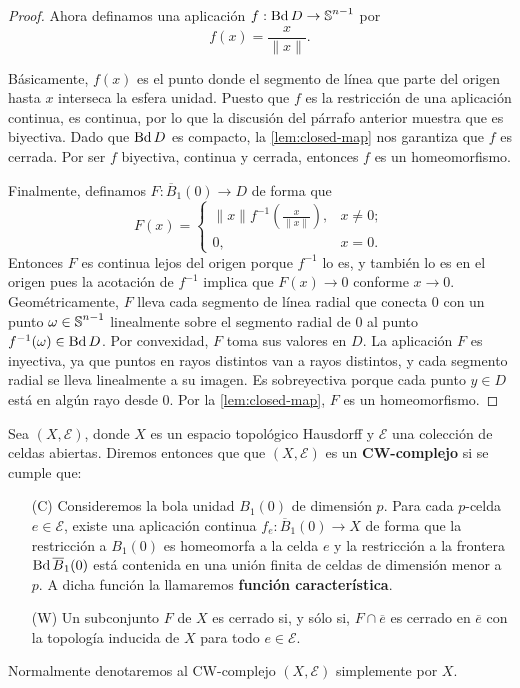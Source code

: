 \begin{proof}
	Ahora definamos una aplicación $f : \operatorname{Bd} D \to \operatorname{\mathbb{S}}^{n-1}$ por
	\[
	f(x) = \frac{x}{\|x\|}.
	\]
	
	Básicamente, $f(x)$ es el punto donde el segmento de línea que parte del
	origen hasta $x$ interseca la esfera unidad. Puesto que $f$ es la restricción de
	una aplicación continua, es continua, por lo que la discusión del párrafo anterior
	muestra que es biyectiva. Dado que $\operatorname{Bd} D$ es compacto, la \autoref{lem:closed-map} nos garantiza que $f$ es cerrada. Por ser $f$ biyectiva, continua y cerrada, entonces $f$ es un homeomorfismo.
	
	Finalmente, definamos $F : \overline{B}_{1}(0) \to D$ de forma que
	\[
	F(x) =
	\begin{cases}
		\|x\| f^{-1}\left( \frac{x}{\|x\|}\right), & x \neq 0; \\
		0,                                     & x = 0.
	\end{cases}
	\]
	Entonces $F$ es continua lejos del origen porque $f^{-1}$ lo es, y también lo es
	en el origen pues la acotación de $f^{-1}$ implica que $F(x) \to 0$ conforme $x
	\to 0$. Geométricamente, $F$ lleva cada segmento de línea radial que conecta $0$
	con un punto $\omega \in \operatorname{\mathbb{S}}^{n-1}$ linealmente sobre el segmento radial de
	$0$ al punto $f^{-1}(\omega) \in \operatorname{Bd} D$. Por convexidad, $F$ toma sus valores en
	$D$. La aplicación $F$ es inyectiva, ya que puntos en rayos distintos van a rayos
	distintos, y cada segmento radial se lleva linealmente a su imagen. Es sobreyectiva
	porque cada punto $y \in D$ está en algún rayo desde $0$. Por la
	\autoref{lem:closed-map}, $F$ es un homeomorfismo.
\end{proof}

\begin{definicion}
	Sea $(X,\mathcal{E})$, donde $X$ es un espacio topológico Hausdorff y
	$\mathcal{E}$ una colección de celdas abiertas. Diremos entonces que que $(X,\mathcal{E}
	)$ es un \textbf{CW-complejo} si se cumple que:
	\begin{enumerate}[font=\bfseries]
		\item[(C)] Consideremos la bola unidad $B_1(0)$ de dimensión $p$. Para cada $p$-celda $e \in \mathcal{E}$, existe una aplicación
		continua $f_{e} : \overline{B}_1(0) \to X$ de forma que la restricción a $B_1(0)$ es
		homeomorfa a la celda $e$ y la restricción a la frontera $\operatorname{Bd} \overline{B}_1(0)$ está contenida en una unión
		finita de celdas de dimensión menor a $p$. A dicha función la llamaremos \textbf{función
			característica}.
		
		\item[(W)] Un subconjunto $F$ de $X$ es cerrado si, y sólo si, $F \cap \overline{e}$ es cerrado en $\overline{e}$ con la topología inducida de $X$ para todo $e \in \mathcal{E}$.
	\end{enumerate}
	Normalmente denotaremos al CW-complejo $(X,\mathcal{E})$ simplemente por $X$.
\end{definicion}

